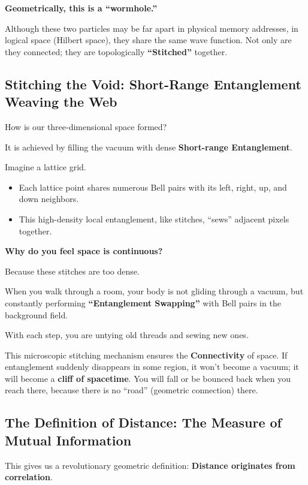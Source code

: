 \textbf{Geometrically, this is a ``wormhole.''}

Although these two particles may be far apart in physical memory addresses, in logical space (Hilbert space), they share the same wave function. Not only are they connected; they are topologically \textbf{``Stitched''} together.

\subsection{Stitching the Void: Short-Range Entanglement Weaving the Web}

How is our three-dimensional space formed?

It is achieved by filling the vacuum with dense \textbf{Short-range Entanglement}.

Imagine a lattice grid.

\begin{itemize}
\item Each lattice point shares numerous Bell pairs with its left, right, up, and down neighbors.

\item This high-density local entanglement, like stitches, ``sews'' adjacent pixels together.
\end{itemize}

\textbf{Why do you feel space is continuous?}

Because these stitches are too dense.

When you walk through a room, your body is not gliding through a vacuum, but constantly performing \textbf{``Entanglement Swapping''} with Bell pairs in the background field.

With each step, you are untying old threads and sewing new ones.

This microscopic stitching mechanism ensures the \textbf{Connectivity} of space. If entanglement suddenly disappears in some region, it won't become a vacuum; it will become a \textbf{cliff of spacetime}. You will fall or be bounced back when you reach there, because there is no ``road'' (geometric connection) there.

\subsection{The Definition of Distance: The Measure of Mutual Information}

This gives us a revolutionary geometric definition: \textbf{Distance originates from correlation}.

